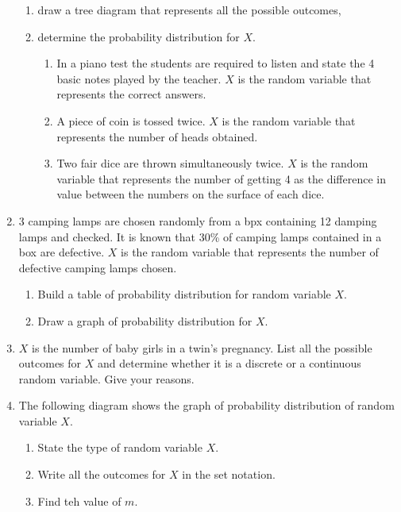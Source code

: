 \documentclass{report}
\begin{document}
\begin{multicols*}{2}
\begin{enumerate}
\begin{enumerate}
                  \item draw a tree diagram that represents all the possible outcomes,

                  \item determine the probability distribution for $X$.

                        \begin{enumerate}
                            \item In a piano test the students are required to listen and state the 4 basic notes
                                  played by the teacher. $X$ is the random variable that represents the correct
                                  answers.

                            \item A piece of coin is tossed twice. $X$ is the random variable that represents the
                                  number of heads obtained.

                            \item Two fair dice are thrown simultaneously twice. $X$ is the random variable that
                                  represents the number of getting 4 as the difference in value between the
                                  numbers on the surface of each dice.
                        \end{enumerate}
              \end{enumerate}

        \item 3 camping lamps are chosen randomly from a bpx containing 12 damping lamps and checked. It is known that 30\% of camping lamps contained in a box are defective. $X$ is the random variable that represents the number of defective camping lamps chosen.
              \begin{enumerate}
                  \item Build a table of probability distribution for random variable $X$.
                  \item Draw a graph of probability distribution for $X$.
              \end{enumerate}

        \item $X$ is the number of baby girls in a twin's pregnancy. List all the possible outcomes for $X$ and determine whether it is a discrete or a continuous random variable. Give your reasons.

        \item The following diagram shows the graph of probability distribution of random
              variable $X$.
              \begin{enumerate}
                  \item State the type of random variable $X$.
                  \item Write all the outcomes for $X$ in the set notation.
                  \item Find teh value of $m$.
              \end{enumerate}


\end{enumerate}
\end{multicols*}
\end{document}

